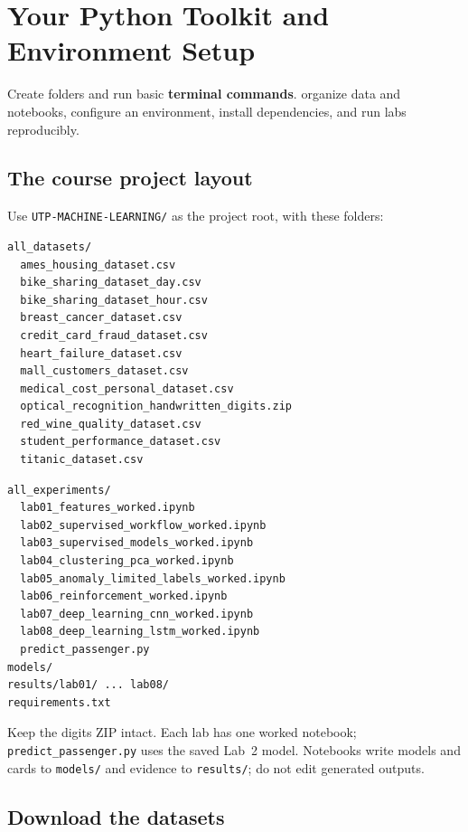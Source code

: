 \chapter{Your Python Toolkit and Environment Setup}
\label{ch:python}

\chapterguide%
  {Create folders and run basic \textbf{terminal commands}.}
  {organize data and notebooks, configure an environment, install dependencies, and run labs reproducibly.}

\section{The course project layout}

Use \texttt{UTP-MACHINE-LEARNING/} as the project root, with these folders:

\noindent
\begin{minipage}[t]{0.49\linewidth}
\begin{lstlisting}[style=mlterminal]
all_datasets/
  ames_housing_dataset.csv
  bike_sharing_dataset_day.csv
  bike_sharing_dataset_hour.csv
  breast_cancer_dataset.csv
  credit_card_fraud_dataset.csv
  heart_failure_dataset.csv
  mall_customers_dataset.csv
  medical_cost_personal_dataset.csv
  optical_recognition_handwritten_digits.zip
  red_wine_quality_dataset.csv
  student_performance_dataset.csv
  titanic_dataset.csv
\end{lstlisting}
\end{minipage}\hfill
\begin{minipage}[t]{0.49\linewidth}
\begin{lstlisting}[style=mlterminal]
all_experiments/
  lab01_features_worked.ipynb
  lab02_supervised_workflow_worked.ipynb
  lab03_supervised_models_worked.ipynb
  lab04_clustering_pca_worked.ipynb
  lab05_anomaly_limited_labels_worked.ipynb
  lab06_reinforcement_worked.ipynb
  lab07_deep_learning_cnn_worked.ipynb
  lab08_deep_learning_lstm_worked.ipynb
  predict_passenger.py
models/
results/lab01/ ... lab08/
requirements.txt
\end{lstlisting}
\end{minipage}

{\footnotesize Keep the digits ZIP intact. Each lab has one worked notebook; \texttt{predict\_passenger.py} uses the saved Lab~2 model. Notebooks write models and cards to \texttt{models/} and evidence to \texttt{results/}; do not edit generated outputs.\par}

\section{Download the datasets}

